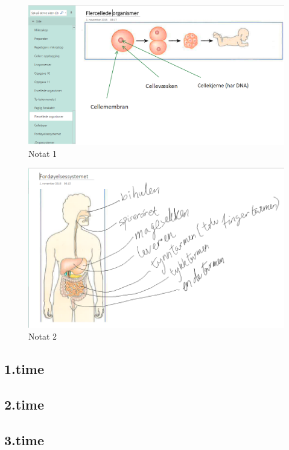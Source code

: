 \documentclass[main.tex]{subfiles}
\begin{document}
\begin{figure}[h!]
\includegraphics[scale = 0.6]{../figures/onenote_flercellet.png}
\caption{Notat 1}
\end{figure}

\begin{figure}[h!]
\includegraphics[scale = 0.6]{../figures/onenote_fordoyelse.png}
\caption{Notat 2}
\end{figure}

\subsection{1.time}

\subsection{2.time}

\subsection{3.time}
\end{document}
